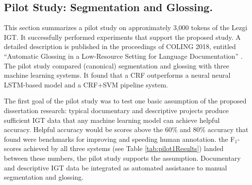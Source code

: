 \subsection{Pilot Study: Segmentation and Glossing.}
\label{sec:pilotseggls}

This section summarizes a pilot study on approximately 3,000 tokens of the Lezgi IGT. It successfully performed experiments that support the proposed study. A detailed description is published in the proceedings of COLING 2018, entitled ``Automatic Glossing in a Low-Resource Setting for Language Documentation'' \citep{moeller_automatic_2018}. The pilot study compared (canonical) segmentation and glossing with three machine learning systems. It found that a CRF outperforms a neural neural LSTM-based model and a CRF+SVM pipeline system. 

The first goal of the pilot study was to test one basic assumption of the proposed dissertation research: typical documentary and descriptive projects produce sufficient IGT data that any machine learning model can achieve helpful accuracy. Helpful accuracy would be scores above the 60\% and 80\% accuracy that \cite{felt_improving_2012} found were benchmarks for improving and speeding human annotation. 
the F$_1$-scores achieved by all three systems (see Table \ref{tab:pilot1Results}) landed between these numbers, the pilot study supports the assumption. Documentary and descriptive IGT data be integrated as automated assistance to manual segmentation and glossing. 

